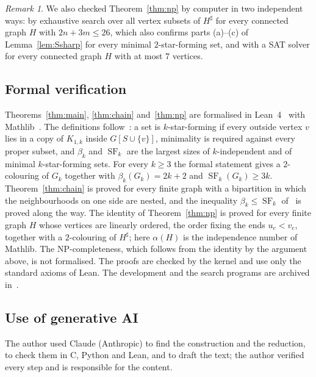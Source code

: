 \documentclass[11pt]{amsart}
\theoremstyle{definition}
\theoremstyle{remark}
\newtheorem{remark}[theorem]{Remark}
\newcommand{\SF}{\operatorname{SF}}
\begin{document}
\begin{remark}\label{rem:sharp}
We also checked Theorem~\ref{thm:np} by computer in two independent ways: by exhaustive search over all vertex subsets of $H^\sharp$ for every connected graph $H$ with $2n+3m\le26$, which also confirms parts (a)--(c) of Lemma~\ref{lem:Ssharp} for every minimal $2$-star-forming set, and with a SAT solver for every connected graph $H$ with at most $7$ vertices.
\end{remark}

\subsection*{Formal verification}
Theorems~\ref{thm:main}, \ref{thm:chain} and~\ref{thm:np} are formalised in Lean~4~\cite{MU} with Mathlib~\cite{Mathlib}. The definitions follow~\cite{Sa}: a set is $k$-star-forming if every outside vertex $v$ lies in a copy of $K_{1,k}$ inside $G[S\cup\{v\}]$, minimality is required against every proper subset, and $\beta_k$ and $\SF_k$ are the largest sizes of $k$-independent and of minimal $k$-star-forming sets. For every $k\ge3$ the formal statement gives a $2$-colouring of $G_k$ together with $\beta_k(G_k)=2k+2$ and $\SF_k(G_k)\ge3k$. Theorem~\ref{thm:chain} is proved for every finite graph with a bipartition in which the neighbourhoods on one side are nested, and the inequality $\beta_k\le\SF_k$ of~\cite{CF} is proved along the way. The identity of Theorem~\ref{thm:np} is proved for every finite graph $H$ whose vertices are linearly ordered, the order fixing the ends $u_e<v_e$, together with a $2$-colouring of $H^\sharp$; here $\alpha(H)$ is the independence number of Mathlib. The NP-completeness, which follows from the identity by the argument above, is not formalised. The proofs are checked by the kernel and use only the standard axioms of Lean. The development and the search programs are archived in~\cite{Ar}.

\subsection*{Use of generative AI}
The author used Claude (Anthropic) to find the construction and the reduction, to check them in C, Python and Lean, and to draft the text; the author verified every step and is responsible for the content.
\end{document}
